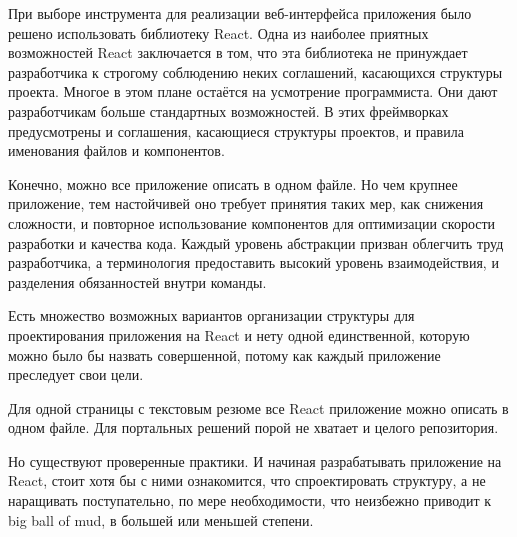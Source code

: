 При выборе инструмента для реализации веб-интерфейса приложения было решено использовать библиотеку React.
Одна из наиболее приятных возможностей React заключается в том, что эта библиотека не принуждает разработчика к строгому соблюдению неких соглашений, касающихся структуры проекта.
Многое в этом плане остаётся на усмотрение программиста.
Они дают разработчикам больше стандартных возможностей.
В этих фреймворках предусмотрены и соглашения, касающиеся структуры проектов, и правила именования файлов и компонентов.

Конечно, можно все приложение описать в одном файле.
Но чем крупнее приложение, тем настойчивей оно требует принятия таких мер, как снижения сложности, и повторное использование компонентов для оптимизации скорости разработки и качества кода.
Каждый уровень абстракции призван облегчить труд разработчика, а терминология предоставить высокий уровень взаимодействия, и разделения обязанностей внутри команды.

Есть множество возможных вариантов организации структуры для проектирования приложения на React и нету одной единственной, которую можно было бы назвать совершенной, потому как каждый приложение преследует свои цели.

Для одной страницы с текстовым резюме все React приложение можно описать в одном файле. Для портальных решений порой не хватает и целого репозитория.

Но существуют проверенные практики.
И начиная разрабатывать приложение на React, стоит хотя бы с ними ознакомится, что спроектировать структуру, а не наращивать поступательно, по мере необходимости, что неизбежно приводит к big ball of mud, в большей или меньшей степени.


\subsubsection{}

